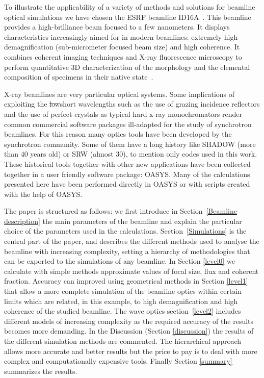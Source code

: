 \documentclass{iucr}              %
\newcommand{\inblue}[1]{{\color{blue}#1}}
\begin{document}
To illustrate the applicability of a variety of methods and solutions for beamline optical simulations we have chosen the ESRF beamline ID16A~{\color{red}\cite{ID16A}}. This beamline provides a high-brilliance beam focused to a few nanometers. It displays characteristics increasingly aimed for in modern beamlines: extremely high demagnification (sub-micrometer focused beam size) and high coherence. It combines coherent imaging techniques and X-ray fluorescence microscopy to perform quantitative 3D characterization of the morphology and the elemental composition of specimens in their native state~{\color{red}\cite{XRFID16A}}. 

X-ray beamlines are very particular optical systems. Some implications of exploiting the {\color{red}\sout{low}short} wavelengths such as the use of grazing incidence reflectors and the use of perfect crystals as typical hard x-ray monochromators render common commercial software packages ill-adapted for the study of synchrotron beamlines. For this reason many optics tools have been developed by the synchrotron community. Some of them have a long history like SHADOW (more than 40 years old) or SRW (almost 30), to mention only codes used in this work. These historical tools together with other new applications have been collected together in a user friendly software package: OASYS. Many of the calculations presented here have been performed directly in OASYS or with scripts created with the help of OASYS. 


The paper is structured as follows: we first introduce in Section~\ref{Beamline description} the main parameters of the beamline and explain the particular choice of the parameters used in the calculations. Section~\ref{Simulations} is the central part of the paper, and describes the different methods used to analyse the beamline with increasing complexity, setting a hierarchy of methodologies that can be exported to the simulations of any beamline. In Section \ref{level0} we calculate with simple methods approximate values of focal size, flux and coherent fraction. Accuracy can improved using geometrical methods in Section \ref{level1} that allow a more complete simulation of the beamline optics within certain limits which are related, in this example, to high demagnification and high coherence of the studied beamline. The wave optics section~\ref{level2} includes different models of increasing complexity as the required accuracy of the results becomes more demanding. \inblue{In the Discussion (Section \ref{discussion}) the results of the different simulation methods are commented. The hierarchical approach allows more accurate and better results but the price to pay is to deal with more complex and computationally expensive tools. Finally Section \ref{summary} summarizes the results.}
\end{document}
